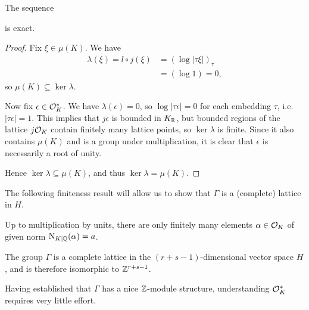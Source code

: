 \begin{prop}
The sequence
\begin{center}
\end{center}
is exact.
\end{prop}
\begin{proof}
	Fix $\xi\in\mu(K)$. We have
	\begin{align*}
		\lambda(\xi) = l\circ j(\xi) &= \left(\log|\tau\xi|\right)_\tau\\
			&= (\log 1) = 0,
	\end{align*}
	so $\mu(K)\subseteq\ker\lambda$.

	Now fix $\epsilon\in\mathcal{O}^*_K$. We have $\lambda(\epsilon)=0$, so $\log|\tau\epsilon|=0$ for each embedding $\tau$, i.e. $|\tau\epsilon|=1$. This implies that $j\epsilon$ is bounded in $K_{\mathbb{R}}$, but bounded regions of the lattice $j\mathcal{O}_K$ contain finitely many lattice points, so $\ker\lambda$ is finite. Since it also contains $\mu(K)$ and is a group under multiplication, it is clear that $\epsilon$ is necessarily a root of unity.

	Hence $\ker\lambda\subseteq\mu(K)$, and thus $\ker\lambda=\mu(K)$.
\end{proof}

The following finiteness result will allow us to show that $\Gamma$ is a (complete) lattice in $H$.

\begin{lem}
	Up to multiplication by units, there are only finitely many elements $\alpha\in\mathcal{O}_K$ of given norm $\operatorname{N}_{K\mid\mathbb{Q}}(\alpha)=a$.
\end{lem}

\begin{thm}
	The group $\Gamma$ is a complete lattice in the $(r+s-1)$-dimensional vector space $H$, and is therefore isomorphic to $\mathbb{Z}^{r+s-1}$.
\end{thm}

Having established that $\Gamma$ has a nice $\mathbb{Z}$-module structure, understanding $\mathcal{O}^*_K$ requires very little effort.

